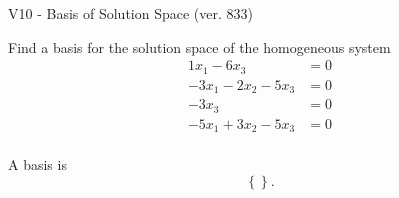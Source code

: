 \begin{exercise}
  \begin{exerciseTitle}V10 - Basis of Solution Space (ver. 833)\end{exerciseTitle}
  \begin{exerciseStatement}
    Find a basis for the solution space of the homogeneous system 
\begin{align*}
 1 x_ 1 -6 x_ 3 &= 0  \\ 
  -3 x_ 1 -2 x_ 2 -5 x_ 3 &= 0  \\ 
  -3 x_ 3 &= 0  \\ 
  -5 x_ 1 + 3 x_ 2 -5 x_ 3 &= 0  \\ 
 \end{align*}


 
  \end{exerciseStatement}

  \begin{exerciseAnswer}
   A basis is   
\[\left\{\right\}.\]

  


  \end{exerciseAnswer}
\end{exercise}
